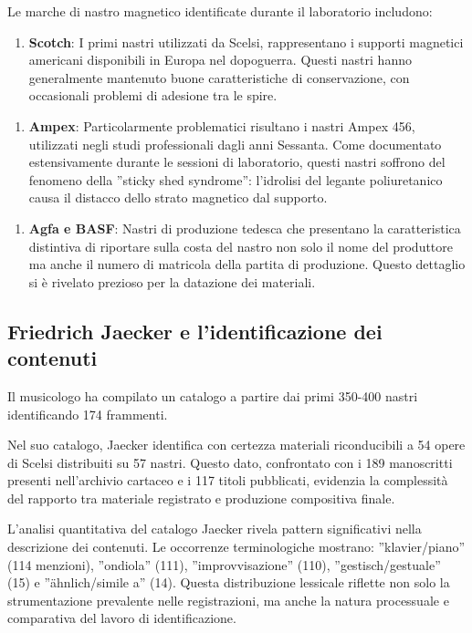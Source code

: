 Le marche di nastro magnetico identificate durante il laboratorio includono:

\begin{enumerate}
    \item \textbf{Scotch}: I primi nastri utilizzati da Scelsi, rappresentano i supporti magnetici americani disponibili in Europa nel dopoguerra. Questi nastri hanno generalmente mantenuto buone caratteristiche di conservazione, con occasionali problemi di adesione tra le spire.
\end{enumerate}

\begin{enumerate}
    \item \textbf{Ampex}: Particolarmente problematici risultano i nastri Ampex 456, utilizzati negli studi professionali dagli anni Sessanta. Come documentato estensivamente durante le sessioni di laboratorio, questi nastri soffrono del fenomeno della ''sticky shed syndrome'': l'idrolisi del legante poliuretanico causa il distacco dello strato magnetico dal supporto.
\end{enumerate}

\begin{enumerate}
    \item \textbf{Agfa e BASF}: Nastri di produzione tedesca che presentano la caratteristica distintiva di riportare sulla costa del nastro non solo il nome del produttore ma anche il numero di matricola della partita di produzione. Questo dettaglio si è rivelato prezioso per la datazione dei materiali.
\end{enumerate}
\subsection{Friedrich Jaecker e l'identificazione dei contenuti}
Il musicologo  ha compilato un catalogo a partire dai primi 350-400 nastri identificando 174 frammenti.

Nel suo catalogo\cite{jaeckercatalogue}, Jaecker identifica con certezza materiali riconducibili a 54 opere di Scelsi distribuiti su 57 nastri. Questo dato, confrontato con i 189 manoscritti presenti nell'archivio cartaceo e i 117 titoli pubblicati, evidenzia la complessità del rapporto tra materiale registrato e produzione compositiva finale\cite[p. 47]{bernardini_pellegrini_scelsi_2016}.

L'analisi quantitativa del catalogo Jaecker rivela pattern significativi nella descrizione dei contenuti. Le occorrenze terminologiche mostrano: ''klavier/piano'' (114 menzioni), ''ondiola'' (111), ''improvvisazione'' (110), ''gestisch/gestuale'' (15) e ''ähnlich/simile a'' (14)\cite[p. 48]{bernardini_pellegrini_scelsi_2016}. Questa distribuzione lessicale riflette non solo la strumentazione prevalente nelle registrazioni, ma anche la natura processuale e comparativa del lavoro di identificazione.
